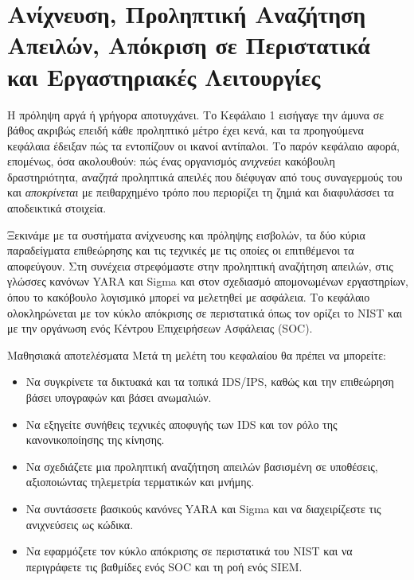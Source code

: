 \chapter{Ανίχνευση, Προληπτική Αναζήτηση Απειλών, Απόκριση σε Περιστατικά και Εργαστηριακές Λειτουργίες}\label{ch:11}

Η πρόληψη αργά ή γρήγορα αποτυγχάνει. Το Κεφάλαιο 1 εισήγαγε την άμυνα σε βάθος ακριβώς επειδή κάθε προληπτικό μέτρο έχει κενά, και τα προηγούμενα κεφάλαια έδειξαν πώς τα εντοπίζουν οι ικανοί αντίπαλοι. Το παρόν κεφάλαιο αφορά, επομένως, όσα ακολουθούν: πώς ένας οργανισμός \emph{ανιχνεύει} κακόβουλη δραστηριότητα, \emph{αναζητά} προληπτικά απειλές που διέφυγαν από τους συναγερμούς του και \emph{αποκρίνεται} με πειθαρχημένο τρόπο που περιορίζει τη ζημιά και διαφυλάσσει τα αποδεικτικά στοιχεία.

Ξεκινάμε με τα συστήματα ανίχνευσης και πρόληψης εισβολών, τα δύο κύρια παραδείγματα επιθεώρησης και τις τεχνικές με τις οποίες οι επιτιθέμενοι τα αποφεύγουν. Στη συνέχεια στρεφόμαστε στην προληπτική αναζήτηση απειλών, στις γλώσσες κανόνων YARA και Sigma και στον σχεδιασμό απομονωμένων εργαστηρίων, όπου το κακόβουλο λογισμικό μπορεί να μελετηθεί με ασφάλεια. Το κεφάλαιο ολοκληρώνεται με τον κύκλο απόκρισης σε περιστατικά όπως τον ορίζει το NIST και με την οργάνωση ενός Κέντρου Επιχειρήσεων Ασφάλειας (SOC).

\begin{outcomesbox}{Μαθησιακά αποτελέσματα}
Μετά τη μελέτη του κεφαλαίου θα πρέπει να μπορείτε:
\begin{itemize}
  \item Να συγκρίνετε τα δικτυακά και τα τοπικά IDS/IPS, καθώς και την επιθεώρηση βάσει υπογραφών και βάσει ανωμαλιών.
  \item Να εξηγείτε συνήθεις τεχνικές αποφυγής των IDS και τον ρόλο της κανονικοποίησης της κίνησης.
  \item Να σχεδιάζετε μια προληπτική αναζήτηση απειλών βασισμένη σε υποθέσεις, αξιοποιώντας τηλεμετρία τερματικών και μνήμης.
  \item Να συντάσσετε βασικούς κανόνες YARA και Sigma και να διαχειρίζεστε τις ανιχνεύσεις ως κώδικα.
  \item Να εφαρμόζετε τον κύκλο απόκρισης σε περιστατικά του NIST και να περιγράφετε τις βαθμίδες ενός SOC και τη ροή ενός SIEM.
\end{itemize}
\end{outcomesbox}

